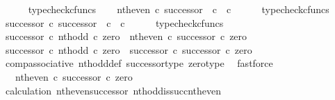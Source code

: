 \begin{isabellebody}
\ \ \ \ \isamarkupfalse%
\ typecheck{\isacharunderscore}{\kern0pt}cfuncs\isanewline
\ \ \isamarkupfalse%
\ {\isachardoublequoteopen}nth{\isacharunderscore}{\kern0pt}even\ {\isasymcirc}\isactrlsub c\ successor\ {\isacharcolon}{\kern0pt}\ {\isasymnat}\isactrlsub c\ {\isasymrightarrow}\ {\isasymnat}\isactrlsub c{\isachardoublequoteclose}\isanewline
\ \ \ \ \isamarkupfalse%
\ typecheck{\isacharunderscore}{\kern0pt}cfuncs\isanewline
\ \ \isamarkupfalse%
\ {\isachardoublequoteopen}successor\ {\isasymcirc}\isactrlsub c\ successor\ {\isacharcolon}{\kern0pt}\ {\isasymnat}\isactrlsub c\ {\isasymrightarrow}\ {\isasymnat}\isactrlsub c{\isachardoublequoteclose}\isanewline
\ \ \ \ \isamarkupfalse%
\ typecheck{\isacharunderscore}{\kern0pt}cfuncs\isanewline
\isanewline
\ \ \isamarkupfalse%
\ {\isachardoublequoteopen}{\isacharparenleft}{\kern0pt}successor\ {\isasymcirc}\isactrlsub c\ nth{\isacharunderscore}{\kern0pt}odd{\isacharparenright}{\kern0pt}\ {\isasymcirc}\isactrlsub c\ zero\ {\isacharequal}{\kern0pt}\ {\isacharparenleft}{\kern0pt}nth{\isacharunderscore}{\kern0pt}even\ {\isasymcirc}\isactrlsub c\ successor{\isacharparenright}{\kern0pt}\ {\isasymcirc}\isactrlsub c\ zero{\isachardoublequoteclose}\isanewline
\ \ \isamarkupfalse%
\ {\isacharminus}{\kern0pt}\isanewline
\ \ \ \ \isamarkupfalse%
\ {\isachardoublequoteopen}{\isacharparenleft}{\kern0pt}successor\ {\isasymcirc}\isactrlsub c\ nth{\isacharunderscore}{\kern0pt}odd{\isacharparenright}{\kern0pt}\ {\isasymcirc}\isactrlsub c\ zero\ {\isacharequal}{\kern0pt}\ successor\ {\isasymcirc}\isactrlsub c\ successor\ {\isasymcirc}\isactrlsub c\ zero{\isachardoublequoteclose}\isanewline
\ \ \ \ \ \ \isamarkupfalse%
\ comp{\isacharunderscore}{\kern0pt}associative{}\ nth{\isacharunderscore}{\kern0pt}odd{\isacharunderscore}{\kern0pt}def{}\ successor{\isacharunderscore}{\kern0pt}type\ zero{\isacharunderscore}{\kern0pt}type\ \isamarkupfalse%
\ fastforce\isanewline
\ \ \ \ \isamarkupfalse%
\ \isamarkupfalse%
\ {\isachardoublequoteopen}{\isachardot}{\kern0pt}{\isachardot}{\kern0pt}{\isachardot}{\kern0pt}\ {\isacharequal}{\kern0pt}\ {\isacharparenleft}{\kern0pt}nth{\isacharunderscore}{\kern0pt}even\ {\isasymcirc}\isactrlsub c\ successor{\isacharparenright}{\kern0pt}\ {\isasymcirc}\isactrlsub c\ zero{\isachardoublequoteclose}\isanewline
\ \ \ \ \ \ \isamarkupfalse%
\ calculation\ nth{\isacharunderscore}{\kern0pt}even{\isacharunderscore}{\kern0pt}successor{}\ nth{\isacharunderscore}{\kern0pt}odd{\isacharunderscore}{\kern0pt}is{\isacharunderscore}{\kern0pt}succ{\isacharunderscore}{\kern0pt}nth{\isacharunderscore}{\kern0pt}even\ \isamarkupfalse%

\end{isabellebody}

